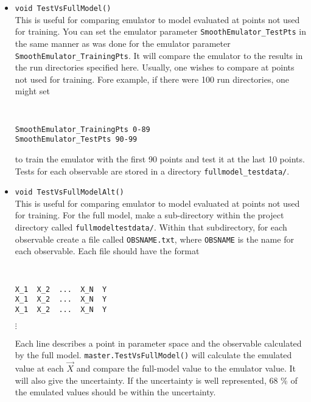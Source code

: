 \documentclass[UserManual.tex]{subfiles}
\begin{document}
\begin{itemize}
\item {\tt void TestVsFullModel()}\\
This is useful for comparing emulator to model evaluated at points not used for training. You can set the emulator parameter {\tt SmoothEmulator\_TestPts} in the same manner as was done for the emulator parameter {\tt SmoothEmulator\_TrainingPts}. It will compare the emulator to the results in the run directories specified here. Usually, one wishes to compare at points not used for training. Fore example, if there were 100 run directories, one might set
{\tt
\begin{verbatim}
SmoothEmulator_TrainingPts 0-89
SmoothEmulator_TestPts 90-99
\end{verbatim}}
to train the emulator with the first 90 points and test it at the last 10 points. Tests for each observable are stored in a directory {\tt fullmodel\_testdata/}.

\item {\tt void TestVsFullModelAlt()}\\
This is useful for comparing emulator to model evaluated at points not used for training. For the full model, make a sub-directory within the project directory called {\tt fullmodeltestdata/}. Within that subdirectory, for each observable create a file called {\tt OBSNAME.txt}, where {\tt OBSNAME} is the name for each observable. Each file should have the format
{\tt
\begin{verbatim}
X_1  X_2  ...  X_N  Y
X_1  X_2  ...  X_N  Y
X_1  X_2  ...  X_N  Y
\end{verbatim}}
\hspace*{36pt}$\vdots$

Each line describes a point in parameter space and the observable calculated by the full model. {\tt master.TestVsFullModel()} will calculate the emulated value at each $\vec{X}$ and compare the full-model value to the emulator value. It will also give the uncertainty. If the uncertainty is well represented, 68 \% of the emulated values should be within the uncertainty.


\end{itemize}
\end{document}
